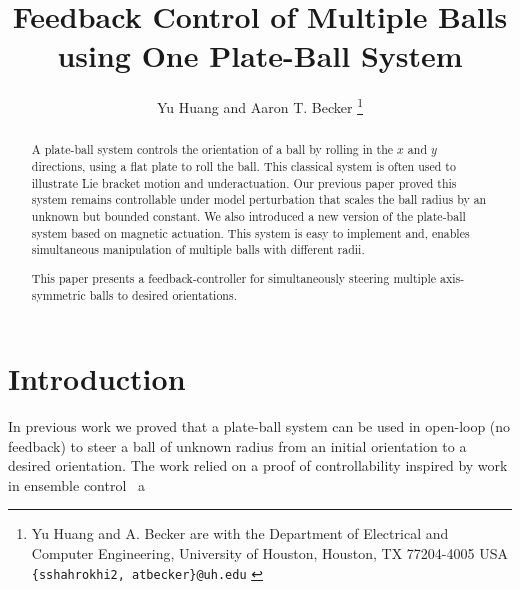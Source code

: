 \documentclass[letter paper, 10pt, conference]{ieeeconf}
\begin{document}
\title{\LARGE \bf 
Feedback Control of Multiple Balls using One Plate-Ball System
}
\author{Yu Huang and  Aaron T. Becker%
\thanks{{Yu Huang and A. Becker are with the Department of Electrical and Computer Engineering,  University of Houston, Houston, TX 77204-4005 USA {\tt\small  \{sshahrokhi2, atbecker\}@uh.edu}
}
} %
} %
\maketitle




\begin{abstract}
A plate-ball system controls the orientation of a ball by rolling in the  $x$ and $y$ directions, using a flat plate to roll the ball. This classical system is often used to illustrate Lie bracket motion and underactuation. Our previous paper proved this system remains controllable under model perturbation that scales the ball radius by an unknown but bounded constant.  We also introduced a new version of the plate-ball system based on magnetic actuation.  This system is easy to implement and, enables simultaneous manipulation of multiple balls with different radii. 

This paper presents a feedback-controller for simultaneously steering multiple axis-symmetric balls to desired orientations.
\end {abstract}



	   

\section{Introduction}\label{sec:Intro}%



In previous work \cite{Becker2012b,Becker2012a,Becker2012j} we proved that a plate-ball system can be used in open-loop (no feedback) to steer a ball of unknown radius from an initial orientation to a desired orientation.  The work relied on a proof of controllability inspired by work in ensemble control~\cite{Brockett1999,Khaneja2000,Li2006,Li2006a,Li2006b,Li2007,Li2009,Li2009a,Li2011,Ruths2011,Ruths2011a,Das2015Broadcast} a
\end{document}
